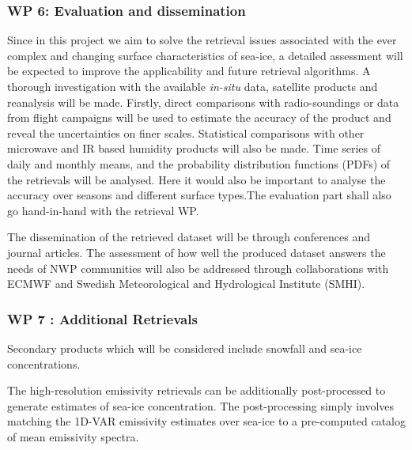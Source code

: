 \documentclass[12pt,oneside,a4paper]{article}
\begin{document}
\subsubsection*{WP 6: Evaluation and dissemination}
%
\label{sec:evaluation}
Since in this project we aim to solve the retrieval issues associated with the ever complex and changing surface characteristics of sea-ice, a detailed assessment will be expected to improve the applicability and future retrieval algorithms. A thorough investigation with the available \textit{in-situ} data, satellite products and reanalysis will be made. Firstly, direct comparisons with radio-soundings or data from flight campaigns will be used to estimate the accuracy of the product and reveal the uncertainties on finer scales. Statistical comparisons with other microwave and IR based humidity products  will also be made. Time series of daily and monthly means, and the probability distribution functions (PDFs) of the retrievals will be analysed. Here it would also be important to analyse the accuracy over seasons and different surface types.The evaluation part shall also go hand-in-hand with the retrieval WP.

The dissemination of the retrieved dataset will be through conferences and journal articles. The assessment of how well the produced dataset answers the needs of NWP communities will also be addressed through collaborations with ECMWF and Swedish Meteorological and Hydrological Institute (SMHI). 

\subsubsection*{WP 7 : Additional Retrievals}
%
\label{sec:other_retrievals}

Secondary products which will be considered include snowfall and sea-ice concentrations.  


The high-resolution emissivity retrievals can be additionally post-processed to generate estimates of sea-ice concentration. The post-processing simply involves matching the 1D-VAR emissivity estimates over sea-ice to a pre-computed catalog of mean emissivity spectra. %
\end{document}
